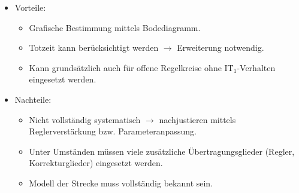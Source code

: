 %
%
\begin{itemize}
	\item Vorteile: 
	\begin{itemize}
		\item Grafische Bestimmung mittels Bodediagramm.
		\item Totzeit kann berücksichtigt werden $\rightarrow$ Erweiterung notwendig.
		\item Kann grundsätzlich auch für offene Regelkreise ohne IT$_{1}$-Verhalten eingesetzt werden.
	\end{itemize}
	\item Nachteile:
	\begin{itemize}
		\item Nicht vollständig systematisch $\rightarrow$ nachjustieren mittels Reglerverstärkung bzw. Parameteranpassung.
		\item Unter Umständen müssen viele zusätzliche Übertragungsglieder (Regler, Korrekturglieder) eingesetzt werden.
		\item Modell der Strecke muss vollständig bekannt sein.
	\end{itemize}
\end{itemize}
%
